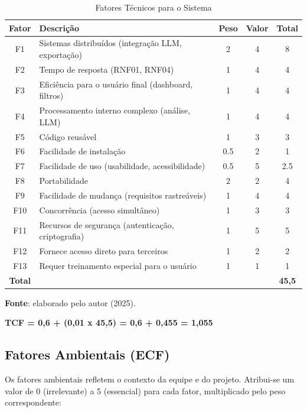 \begin{longtable}{|c|p{}|c|c|c|}
\caption{Fatores Técnicos para o Sistema}
\label{tab:fatores-tecnicos}\\
\hline
\textbf{Fator} & \textbf{Descrição} & \textbf{Peso} & \textbf{Valor} & \textbf{Total} \\
\hline
\endfirsthead
\endhead
F1 & Sistemas distribuídos (integração LLM, exportação) & 2 & 4 & 8 \\
\hline
F2 & Tempo de resposta (RNF01, RNF04) & 1 & 4 & 4 \\
\hline
F3 & Eficiência para o usuário final (dashboard, filtros) & 1 & 4 & 4 \\
\hline
F4 & Processamento interno complexo (análise, LLM) & 1 & 4 & 4 \\
\hline
F5 & Código reusável & 1 & 3 & 3 \\
\hline
F6 & Facilidade de instalação & 0.5 & 2 & 1 \\
\hline
F7 & Facilidade de uso (usabilidade, acessibilidade) & 0.5 & 5 & 2.5 \\
\hline
F8 & Portabilidade & 2 & 2 & 4 \\
\hline
F9 & Facilidade de mudança (requisitos rastreáveis) & 1 & 4 & 4 \\
\hline
F10 & Concorrência (acesso simultâneo) & 1 & 3 & 3 \\
\hline
F11 & Recursos de segurança (autenticação, criptografia) & 1 & 5 & 5 \\
\hline
F12 & Fornece acesso direto para terceiros & 1 & 2 & 2 \\
\hline
F13 & Requer treinamento especial para o usuário & 1 & 1 & 1 \\
\hline
\textbf{Total} & & & & \textbf{45,5} \\
\hline
\end{longtable}

\begin{center}
    \small{\textbf{Fonte}: elaborado pelo autor (2025).}
\end{center}


\textbf{TCF = 0,6 + (0,01 x 45,5) = 0,6 + 0,455 = 1,055}

\subsection{Fatores Ambientais (ECF)}

Os fatores ambientais refletem o contexto da equipe e do projeto. Atribui-se um valor de 0 (irrelevante) a 5 (essencial) para cada fator, multiplicado pelo peso correspondente:

